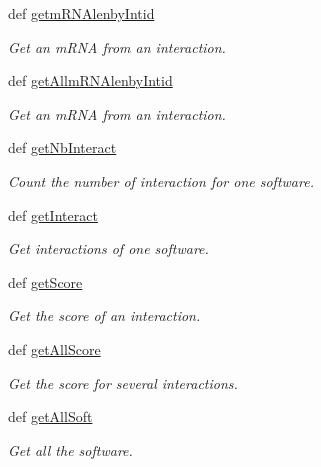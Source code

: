 \begin{DoxyCompactItemize}
def \hyperlink{classirna_1_1iRNA__pred_1_1Sqlite__manager_1_1Sqlite__manager_a4b7c3e61ec03142f8e54eb958ec000db}{getm\-R\-N\-Alenby\-Intid}
\begin{DoxyCompactList}\small\item\em \-Get an m\-R\-N\-A from an interaction. \end{DoxyCompactList}\item 
def \hyperlink{classirna_1_1iRNA__pred_1_1Sqlite__manager_1_1Sqlite__manager_add4f439129ee312e04fa573192140778}{get\-Allm\-R\-N\-Alenby\-Intid}
\begin{DoxyCompactList}\small\item\em \-Get an m\-R\-N\-A from an interaction. \end{DoxyCompactList}\item 
def \hyperlink{classirna_1_1iRNA__pred_1_1Sqlite__manager_1_1Sqlite__manager_a107cbbe309c1483e7f444a062d8723fd}{get\-Nb\-Interact}
\begin{DoxyCompactList}\small\item\em \-Count the number of interaction for one software. \end{DoxyCompactList}\item 
def \hyperlink{classirna_1_1iRNA__pred_1_1Sqlite__manager_1_1Sqlite__manager_a5d66b1a8ab3fec8350c0f74c12e1725a}{get\-Interact}
\begin{DoxyCompactList}\small\item\em \-Get interactions of one software. \end{DoxyCompactList}\item 
def \hyperlink{classirna_1_1iRNA__pred_1_1Sqlite__manager_1_1Sqlite__manager_a47cd2b34913c85a5ac361642cbd0c3c5}{get\-Score}
\begin{DoxyCompactList}\small\item\em \-Get the score of an interaction. \end{DoxyCompactList}\item 
def \hyperlink{classirna_1_1iRNA__pred_1_1Sqlite__manager_1_1Sqlite__manager_a22b2b76603b0fdcde8ec3a0cae539f48}{get\-All\-Score}
\begin{DoxyCompactList}\small\item\em \-Get the score for several interactions. \end{DoxyCompactList}\item 
def \hyperlink{classirna_1_1iRNA__pred_1_1Sqlite__manager_1_1Sqlite__manager_a7a74bfefd9d86308304d10ddf3c69529}{get\-All\-Soft}
\begin{DoxyCompactList}\small\item\em \-Get all the software. \end{DoxyCompactList}\item 

\end{DoxyCompactItemize}
